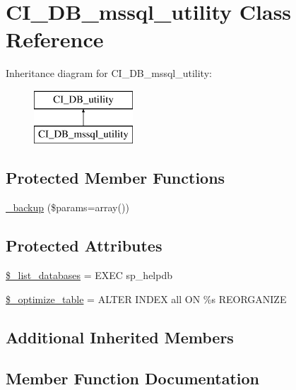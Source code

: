\hypertarget{class_c_i___d_b__mssql__utility}{}\section{C\+I\+\_\+\+D\+B\+\_\+mssql\+\_\+utility Class Reference}
\label{class_c_i___d_b__mssql__utility}
Inheritance diagram for C\+I\+\_\+\+D\+B\+\_\+mssql\+\_\+utility\+:\begin{figure}[H]
\begin{center}
\leavevmode
\includegraphics[height=2.000000cm]{class_c_i___d_b__mssql__utility}
\end{center}
\end{figure}
\subsection*{Protected Member Functions}
\begin{DoxyCompactItemize}
\item 
\mbox{\hyperlink{class_c_i___d_b__mssql__utility_a30f3053d2c82e7562349924363507afa}{\+\_\+backup}} (\$params=array())
\end{DoxyCompactItemize}
\subsection*{Protected Attributes}
\begin{DoxyCompactItemize}
\item 
\mbox{\hyperlink{class_c_i___d_b__mssql__utility_afe3a5b80562d93d6bc7e2b53c95b7e5a}{\$\+\_\+list\+\_\+databases}} = \textquotesingle{}E\+X\+EC sp\+\_\+helpdb\textquotesingle{}
\item 
\mbox{\hyperlink{class_c_i___d_b__mssql__utility_a083199e5c22c78912dae0a47bb2d7fad}{\$\+\_\+optimize\+\_\+table}} = \textquotesingle{}A\+L\+T\+ER I\+N\+D\+EX all ON \%s R\+E\+O\+R\+G\+A\+N\+I\+ZE\textquotesingle{}
\end{DoxyCompactItemize}
\subsection*{Additional Inherited Members}


\subsection{Member Function Documentation}
\mbox{\label{class_c_i___d_b__mssql__utility_a30f3053d2c82e7562349924363507afa}} 
